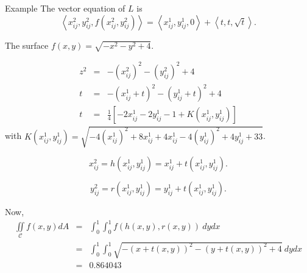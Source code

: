 \documentclass[a4paper,10pt]{article}
\begin{document}
\begin{section}{Example}
The vector equation of $L$ is
\begin{equation}
\left <x_{ij}^2,y_{ij}^2,f(x_{ij}^2,y_{ij}^2) \right > = \left < x_{ij}^1, y_{ij}^1, 0\right > + \left < t,t,\sqrt{t}\right >.  
\end{equation}

The surface $f(x,y) = \sqrt{-x^2 - y^2 + 4}$.

\begin{eqnarray}
z^2 &=& - (x_{ij}^2)^2 - (y_{ij}^2)^2 + 4\\
t &=& -(x_{ij}^1 + t)^2 - (y_{ij}^1 + t)^2 + 4\\
t &=& \frac{1}{4}[-2 x_{ij}^1 - 2 y_{ij}^1  -  1 + K(x_{ij}^1,y_{ij}^1)]
\end{eqnarray}
with $K(x_{ij}^1,y_{ij}^1) = \sqrt{-4(x_{ij}^1)^2+8x_{ij}^1+4x_{ij}^1-4(y_{ij}^1)^2+4y_{ij}^1 + 33}$.

\begin{equation}
x_{ij}^2 = h(x_{ij}^1,y_{ij}^1) = x_{ij}^1 + t(x_{ij}^1,y_{ij}^1).
\end{equation}

\begin{equation}
y_{ij}^2 = r(x_{ij}^1,y_{ij}^1) = y_{ij}^1 + t(x_{ij}^1,y_{ij}^1).  
\end{equation}

Now,
\begin{eqnarray}
\iint\limits_{\!\mathcal{C}} f(x,y) dA &=& \int_0^1\int_0^1 f(h(x,y),r(x,y))~dydx\\
&=& \int_0^1 \int_0^1 \sqrt{-(x+t(x,y))^2 - (y+t(x,y))^2 + 4} ~dydx\\
&=& 0.864043
\end{eqnarray}

\end{section}
\end{document}
